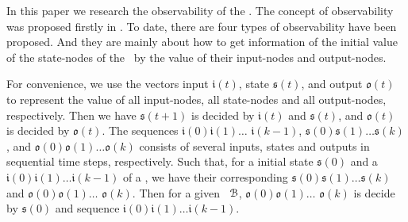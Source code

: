 In this paper we research the observability of the \BCNs. The concept of observability was proposed firstly in \cite{cheng2009controllability}. To date, there are four types of observability have been proposed. And they are mainly about how to get  information of the initial value of the state-nodes of the \BCNs\ by the value of their input-nodes and output-nodes. 

For convenience, we use the vectors input $\mathfrak{i}(t)$, state $\mathfrak{s}(t)$, and output $\mathfrak{o}(t)$ to represent the value of all input-nodes, all state-nodes and all output-nodes, respectively. Then we have $\mathfrak{s}(t+1)$ is decided by $\mathfrak{i}(t)$ and $\mathfrak{s}(t)$, and $\mathfrak{o}(t)$ is decided by $\mathfrak{o}(t)$.
 The sequences $\mathfrak{i}(0)$$\mathfrak{i}(1)\ldots$
$\mathfrak{i}(k-1)$,  $\mathfrak{s}(0) $$\mathfrak{s}(1)\ldots$$\mathfrak{s}(k)$, and $\mathfrak{o}(0)$$\mathfrak{o}(1)\ldots$$\mathfrak{o}(k)$ 
 consists of several inputs, states and outputs  in sequential time steps,  respectively. 
 Such that, for a initial state $\mathfrak{s}(0)$ and a $\mathfrak{i}(0)$$\mathfrak{i}(1)\ldots$$\mathfrak{i}(k-1)$ of a \BCN, we have their corresponding 
$\mathfrak{s}(0) $$\mathfrak{s}(1)\ldots $$\mathfrak{s}(k)$ and $\mathfrak{o}(0) $$\mathfrak{o}(1)\ldots$ $\mathfrak{o}(k)$.  
Then for a given  \BCN\  ${\mathcal{B}}$,  $\mathfrak{o}(0) $$\mathfrak{o}(1)\ldots$ $\mathfrak{o}(k)$ is decide by
$\mathfrak{s}(0)$ and sequence $\mathfrak{i}(0)$$\mathfrak{i}(1)\ldots$$\mathfrak{i}(k-1)$. 
 

